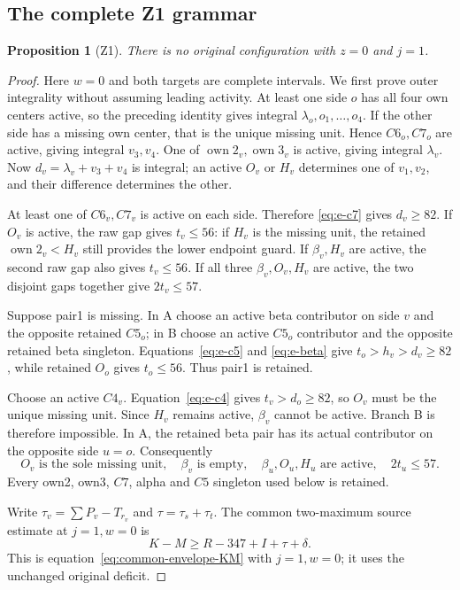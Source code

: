 \documentclass[11pt,letterpaper]{article}
\newcommand{\own}{\operatorname{own}}
\newtheorem{proposition}[theorem]{Proposition}
\theoremstyle{definition}\newtheorem{definition}[theorem]{Definition}
\begin{document}
\subsection{The complete Z1 grammar}\label{sec:z1}
\begin{proposition}[Z1]\label{prop:z1}
There is no original configuration with $z=0$ and $j=1$.
\end{proposition}
\begin{proof}
Here $w=0$ and both targets are complete intervals. We first prove outer integrality without assuming leading activity. At least one side $o$ has all four own centers active, so the preceding identity gives integral $\lambda_o,o_1,\ldots,o_4$. If the other side has a missing own center, that is the unique missing unit. Hence $C6_o,C7_o$ are active, giving integral $v_3,v_4$. One of $\own2_v,\own3_v$ is active, giving integral $\lambda_v$. Now $d_v=\lambda_v+v_3+v_4$ is integral; an active $O_v$ or $H_v$ determines one of $v_1,v_2$, and their difference determines the other.

At least one of $C6_v,C7_v$ is active on each side. Therefore \eqref{eq:e-c7} gives $d_v\ge82$. If $O_v$ is active, the raw gap gives $t_v\le56$: if $H_v$ is the missing unit, the retained $\own2_v<H_v$ still provides the lower endpoint guard. If $\beta_v,H_v$ are active, the second raw gap also gives $t_v\le56$. If all three $\beta_v,O_v,H_v$ are active, the two disjoint gaps together give $2t_v\le57$.

Suppose pair1 is missing. In A choose an active beta contributor on side $v$ and the opposite retained $C5_o$; in B choose an active $C5_o$ contributor and the opposite retained beta singleton. Equations~\eqref{eq:e-c5} and \eqref{eq:e-beta} give $t_o>h_v>d_v\ge82$, while retained $O_o$ gives $t_o\le56$. Thus pair1 is retained.

Choose an active $C4_v$. Equation~\eqref{eq:e-c4} gives $t_v>d_o\ge82$, so $O_v$ must be the unique missing unit. Since $H_v$ remains active, $\beta_v$ cannot be active. Branch B is therefore impossible. In A, the retained beta pair has its actual contributor on the opposite side $u=o$. Consequently
\[
O_v\text{ is the sole missing unit},\quad \beta_v\text{ is empty},\quad
\beta_u,O_u,H_u\text{ are active},\quad 2t_u\le57.\tag{Z1.1}
\]
Every own2, own3, $C7$, alpha and $C5$ singleton used below is retained.

Write $\tau_v=\sum P_v-T_{r_v}$ and $\tau=\tau_s+\tau_t$. The common two-maximum source estimate at $j=1,w=0$ is
\[
K-M\ge R-347+I+\tau+\delta.\tag{Z1.2}
\]
This is equation~\eqref{eq:common-envelope-KM} with $j=1,w=0$; it uses the unchanged original deficit.


\end{proof}
\end{document}
